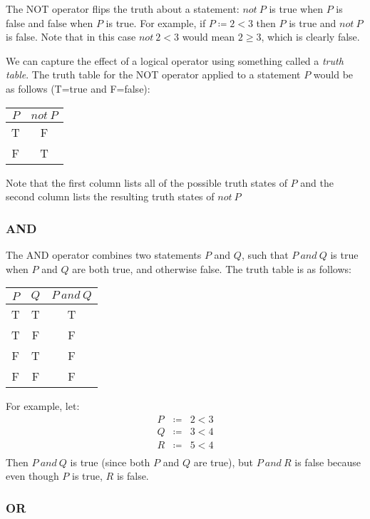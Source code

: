 \documentclass[letterpaper,12pt,fleqn]{article}
\begin{document}
The NOT operator flips the truth about a statement: $not\ P$ is true when $P$
is false and false when $P$ is true. For example, if $P\coloneqq 2<3$ then $P$
is true and $not\ P$ is false. Note that in this case $not\ 2<3$ would mean
$2\ge3$, which is clearly false.

We can capture the effect of a logical operator using something called a
\emph{truth table}. The truth table for the NOT operator applied to a statement
$P$ would be as follows (T=true and F=false):

\begin{tabular}{|c|c|}
\hline
$P$ & $not\ P$ \\
\hline
T & F \\
\hline
F & T \\
\hline
\end{tabular}

Note that the first column lists all of the possible truth states of $P$ and the
second column lists the resulting truth states of $not\ P$

\subsubsection*{AND}

The AND operator combines two statements $P$ and $Q$, such that $P\ and\ Q$ is
true when $P$ and $Q$ are both true, and otherwise false. The truth table is as
follows:

\begin{tabular}{|cc|c|}
\hline
$P$ & $Q$ & $P\ and\ Q$ \\
\hline
T & T & T \\
\hline
T & F & F \\
\hline
F & T & F \\
\hline
F & F & F \\
\hline
\end{tabular}

For example, let:
\begin{eqnarray*}
P &\coloneqq& 2<3 \\
Q &\coloneqq& 3<4 \\
R &\coloneqq& 5<4 \\
\end{eqnarray*}
Then $P\ and\ Q$ is true (since both $P$ and $Q$ are true), but $P\ and\ R$ is
false because even though $P$ is true, $R$ is false.

\subsubsection*{OR}
\end{document}
